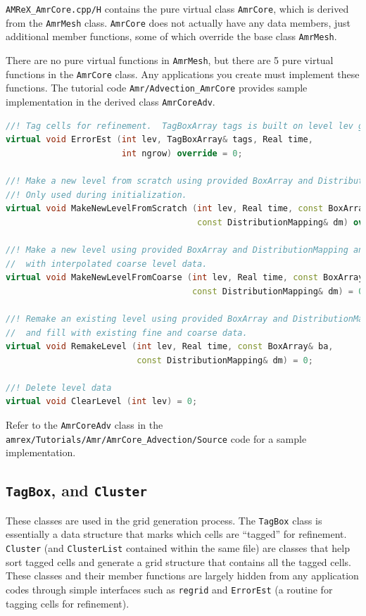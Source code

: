{\tt AMReX\_AmrCore.cpp/H} contains the pure virtual class {\tt AmrCore}, 
which is derived from the {\tt AmrMesh} class.  {\tt AmrCore} does not actually 
have any data members, just additional member functions, some of which override 
the base class {\tt AmrMesh}.

There are no pure virtual functions in {\tt AmrMesh}, but 
there are 5 pure virtual functions in the {\tt AmrCore} class.  Any applications
you create must implement these functions.  The tutorial code 
{\tt Amr/Advection\_AmrCore} provides sample implementation in the derived
class {\tt AmrCoreAdv}.

\begin{lstlisting}[language=cpp]
//! Tag cells for refinement.  TagBoxArray tags is built on level lev grids.
virtual void ErrorEst (int lev, TagBoxArray& tags, Real time, 
                       int ngrow) override = 0;

//! Make a new level from scratch using provided BoxArray and DistributionMapping.
//! Only used during initialization.
virtual void MakeNewLevelFromScratch (int lev, Real time, const BoxArray& ba, 
                                      const DistributionMapping& dm) override = 0;

//! Make a new level using provided BoxArray and DistributionMapping and fill 
//  with interpolated coarse level data.
virtual void MakeNewLevelFromCoarse (int lev, Real time, const BoxArray& ba, 
                                     const DistributionMapping& dm) = 0;

//! Remake an existing level using provided BoxArray and DistributionMapping 
//  and fill with existing fine and coarse data.
virtual void RemakeLevel (int lev, Real time, const BoxArray& ba, 
                          const DistributionMapping& dm) = 0;

//! Delete level data
virtual void ClearLevel (int lev) = 0;
\end{lstlisting}
Refer to the {\tt AmrCoreAdv} class in the 
{\tt amrex/Tutorials/Amr/AmrCore\_Advection/Source} 
code for a sample implementation.

\subsection{{\tt TagBox}, and {\tt Cluster}}
These classes are used in the grid generation process.
The {\tt TagBox} class is essentially a data structure that marks which
cells are ``tagged'' for refinement.
{\tt Cluster} (and {\tt ClusterList} contained within the same file) are classes
that help sort tagged cells and generate a grid structure that contains all
the tagged cells.  These classes and their member functions are largely
hidden from any application codes through simple interfaces
such as {\tt regrid} and {\tt ErrorEst} (a routine for tagging cells for refinement).

